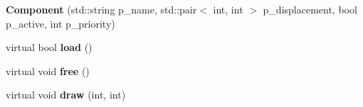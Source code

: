 \begin{DoxyCompactItemize}
\item 
{\bfseries Component} (std\+::string p\+\_\+name, std\+::pair$<$ int, int $>$ p\+\_\+displacement, bool p\+\_\+active, int p\+\_\+priority)\hypertarget{classengine_1_1_component_a98a00f27d6a6179fcc9120586a3c785d}{}\label{classengine_1_1_component_a98a00f27d6a6179fcc9120586a3c785d}

\item 
virtual bool {\bfseries load} ()\hypertarget{classengine_1_1_component_a2c5fda0dee980614a92bbccad2834772}{}\label{classengine_1_1_component_a2c5fda0dee980614a92bbccad2834772}

\item 
virtual void {\bfseries free} ()\hypertarget{classengine_1_1_component_a932eb4b0cf9d99903e3e6d2508e8fd92}{}\label{classengine_1_1_component_a932eb4b0cf9d99903e3e6d2508e8fd92}

\item 
virtual void {\bfseries draw} (int, int)\hypertarget{classengine_1_1_component_a00aaccbcf3ba091638c1af7e59f32bec}{}\label{classengine_1_1_component_a00aaccbcf3ba091638c1af7e59f32bec}


\end{DoxyCompactItemize}
